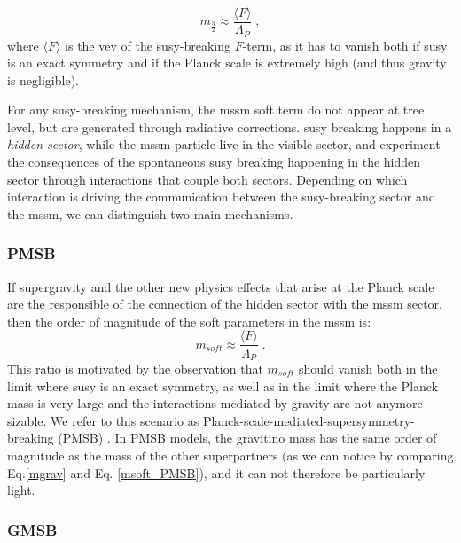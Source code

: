 \begin{equation}
m_{\frac{3}{2}} \approx \frac{\langle F \rangle}{\Lambda_P} \; ,
\label{mgrav}
\end{equation}
\noindent where $\langle F \rangle$ is the \gls{vev} of the \gls{susy}-breaking $F$-term, as it has to vanish both if \gls{susy} is an exact symmetry and if the Planck scale is extremely high (and thus gravity is negligible). 

For any \gls{susy}-breaking mechanism, the \gls{mssm} soft term do not appear at tree level, but are generated through radiative corrections. \gls{susy} breaking happens in a \textit{hidden sector}, while the \gls{mssm} particle live in the visible sector, and experiment the consequences of the spontaneous \gls{susy} breaking happening in the hidden sector through interactions that couple both sectors. Depending on which interaction is driving the communication between the \gls{susy}-breaking sector and the \gls{mssm}, we can distinguish two main mechanisms.

\subsubsection*{PMSB} 

If supergravity and the other new physics effects that arise at the Planck scale are the responsible of the connection of the hidden sector with the \gls{mssm} sector, then the order of magnitude of the soft parameters in the \gls{mssm} is:
\begin{equation}
m_{soft} \approx \frac{\langle F \rangle}{\Lambda_P} \; .
\label{msoft_PMSB}
\end{equation}
\noindent This ratio is motivated by the observation that $m_{soft}$ should vanish both in the limit where \gls{susy} is an exact symmetry, as well as in the limit where the Planck mass is very large and the interactions mediated by gravity are not anymore sizable. We refer to this scenario as Planck-scale-mediated-supersymmetry-breaking (PMSB) \cite{PhysRevLett.49.970, BARBIERI1982343, IBANEZ198273, PhysRevD.27.2359}. In PMSB models, the gravitino mass has the same order of magnitude as the mass of the other superpartners (as we can notice by comparing Eq.\ref{mgrav} and Eq. \ref{msoft_PMSB}), and it can not therefore be particularly light. 

\subsubsection*{GMSB}

